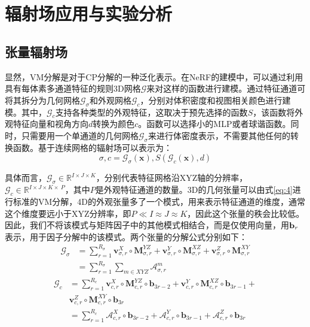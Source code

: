 \documentclass[10pt,twocolumn,letterpaper]{article}
\begin{document}
\section{辐射场应用与实验分析}
\label{sec:analysis}

\subsection{张量辐射场}
显然，VM分解是对于CP分解的一种泛化表示。在NeRF的建模中，可以通过利用具有每体素多通道特征的规则3D网格$\mathcal G$来对这样的函数进行建模。通过特征通道可将其拆分为几何网格$\mathcal G_σ$和外观网格$\mathcal G_c$，分别对体积密度和视图相关颜色进行建模。其中，$\mathcal G_c$支持各种类型的外观特征，这取决于预先选择的函数$S$，该函数将外观特征向量和视角方向$d$转换为颜色$c$。函数可以选择小的MLP或者球谐函数。同时，只需要用一个单通道的几何网格$\mathcal G_\sigma$来进行体密度表示，不需要其他任何的转换函数。基于连续网格的辐射场可以表示为：
\begin{equation}
  \sigma, c=\mathcal{G}_{\sigma}(\mathbf{x}), S\left(\mathcal{G}_{c}(\mathbf{x}), d\right)
\end{equation}
\label{eq:7}

具体而言，$\mathcal G_\sigma\in\mathbb R^{I\times J\times K}$，分别代表特征网格沿XYZ轴的分辨率，$\mathcal G_c\in\mathbb R^{I\times J\times K\times\ P }$，其中$P$是外观特征通道的数量。3D的几何张量可以由式\ref{eq:4}进行标准的VM分解，4D的外观张量多了一个模式，用来表示特征通道的维度，通常这个维度要远小于XYZ分辨率，即$P \ll I\approx J\approx K$，因此这个张量的秩会比较低。因此，我们不将该模式与矩阵因子中的其他模式相结合，而是仅使用向量，用$\bold b_r$表示，用于因子分解中的该模式。两个张量的分解公式分别如下：
\begin{equation}
  \begin{aligned}\mathcal{G}_{\sigma}&=\sum_{r=1}^{R_{\sigma}} \mathbf{v}_{\sigma, r}^{X} \circ \mathbf{M}_{\sigma, r}^{Y Z}+\mathbf{v}_{\sigma, r}^{Y} \circ \mathbf{M}_{\sigma, r}^{X Z}+\mathbf{v}_{\sigma, r}^{Z} \circ \mathbf{M}_{\sigma, r}^{X Y}\\&=\sum_{r=1}^{R_{\sigma}} \sum_{m \in X Y Z} \mathcal{A}_{\sigma, r}^{m}\end{aligned}
\end{equation}
\label{eq:8}
\begin{equation}
  \begin{aligned}\mathcal{G}_{c} & =\sum_{r=1}^{R_{c}} \mathbf{v}_{c, r}^{X} \circ \mathbf{M}_{c, r}^{Y Z} \circ \mathbf{b}_{3 r-2}+\mathbf{v}_{c, r}^{Y} \circ \mathbf{M}_{c, r}^{X Z} \circ \mathbf{b}_{3 r-1}+\\& \mathbf{v}_{c, r}^{Z} \circ \mathbf{M}_{c, r}^{X Y} \circ \mathbf{b}_{3 r} \\& =\sum_{r=1}^{R_{c}} \mathcal{A}_{c, r}^{X} \circ \mathbf{b}_{3 r-2}+\mathcal{A}_{c, r}^{Y} \circ \mathbf{b}_{3 r-1}+\mathcal{A}_{c, r}^{Z} \circ \mathbf{b}_{3 r}\end{aligned}
\end{equation}
\label{eq:9}
\end{document}
